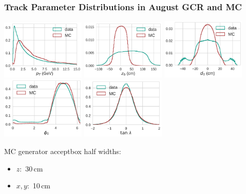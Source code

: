 \documentclass[18pt]{beamer}
\begin{document}
\begin{frame}
  \frametitle{Track Parameter Distributions in August GCR and MC}
  \begin{center}
    \includegraphics[width=0.3\textwidth]{figures/distributions/gcr_august_2017_pt_distribution_normed=True.pdf}
    \includegraphics[width=0.3\textwidth]{figures/distributions/gcr_august_2017_z0_distribution_normed=True.pdf}
    \includegraphics[width=0.3\textwidth]{figures/distributions/gcr_august_2017_d0_distribution_normed=True.pdf}\\
    \includegraphics[width=0.3\textwidth]{figures/distributions/gcr_august_2017_phi0_distribution_normed=True.pdf}
    \includegraphics[width=0.3\textwidth]{figures/distributions/gcr_august_2017_tan_lambda_distribution_normed=True.pdf}
  \end{center}
MC generator acceptbox half widths:
    \begin{itemize}
    \item $z:$ 30\,cm
    \item $x, y:$ 10\,cm
    \end{itemize}

\end{frame}
    
\end{document}

